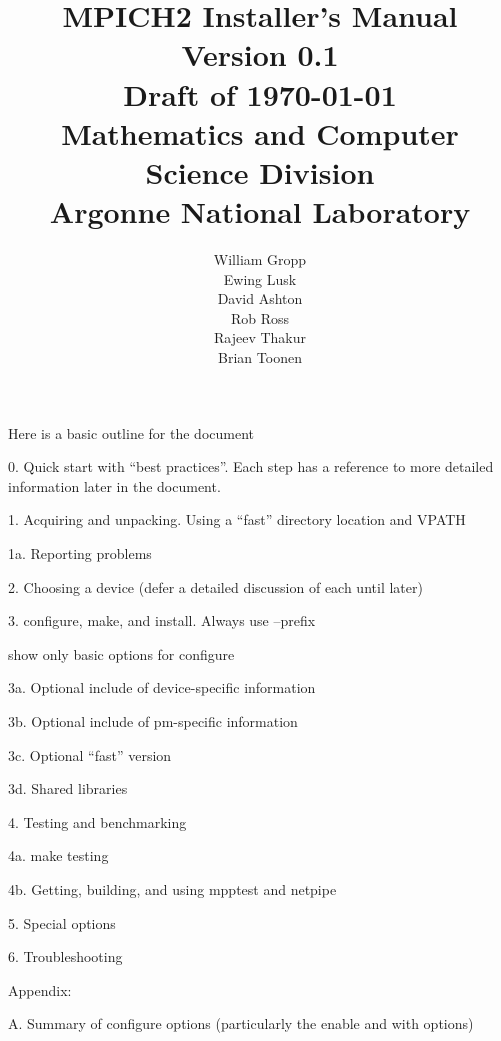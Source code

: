 \documentclass[dvipdfm,11pt]{article}
\begin{document}
\title{MPICH2 Installer's Manual\\
Version 0.1\\
Draft of \today \\
Mathematics and Computer Science Division\\
Argonne National Laboratory}

\author{William Gropp\\
Ewing Lusk\\
David Ashton\\
Rob Ross\\
Rajeev Thakur\\
Brian Toonen}

\maketitle
\cleardoublepage

\tableofcontents
\clearpage

\pagestyle{headings}

Here is a basic outline for the document

0. Quick start with ``best practices''.  Each step has a reference to
more detailed information later in the document.

1. Acquiring and unpacking.  Using a ``fast'' directory location and
   VPATH

1a. Reporting problems

2. Choosing a device (defer a detailed discussion of each until later)

3. configure, make, and install.  Always use --prefix 

show only basic options for configure

   3a. Optional include of device-specific information

   3b. Optional include of pm-specific information
 
   3c. Optional ``fast'' version

   3d. Shared libraries

4. Testing and benchmarking

4a. make testing

4b. Getting, building, and using mpptest and netpipe

5. Special options

6. Troubleshooting

Appendix:

A. Summary of configure options (particularly the enable and with options)
\end{document}
